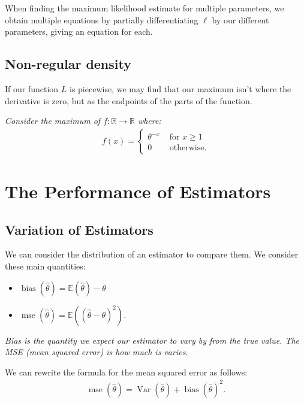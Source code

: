 \documentclass[a4paper, 12pt, twoside]{article}
\DeclareMathOperator{\Mse}{mse}
\DeclareMathOperator{\Bias}{bias}
\DeclareMathOperator{\Var}{Var}
\begin{document}
When finding the maximum likelihood estimate for multiple parameters, we
obtain multiple equations by partially differentiating $\ell$ by our
different parameters, giving an equation for each.

\subsection{Non-regular density}

If our function $L$ is piecewise, we may find that our maximum isn't where
the derivative is zero, but as the endpoints of the parts of the function.

\vspace{\baselineskip}

\textit{Consider the maximum of $f:\mathbb{R} \to \mathbb{R}$ where:}
\begin{align*}
    f(x) = \begin{cases}
        \theta^{-x} & \text{ for } x \geq 1 \\
        0           & \text{ otherwise.}
    \end{cases}
\end{align*}

\section{The Performance of Estimators}

\subsection{Variation of Estimators}

We can consider the distribution of an estimator to compare them. We
consider these main quantities:

\begin{itemize}
    \item $\Bias(\hat\theta) = \mathbb{E}(\hat\theta) - \theta$
    \item $\Mse(\hat\theta) = \mathbb{E}((\hat\theta - \theta)^2)$.
\end{itemize}

\textit{Bias is the quantity we expect our estimator to vary by from
    the true value. The MSE (mean squared error) is how much is varies.}

\vspace{\baselineskip}

We can rewrite the formula for the mean squared error as follows:
\begin{align*}
    \Mse(\hat\theta) = \Var(\hat\theta) + \Bias(\hat\theta)^2.
\end{align*}
\end{document}

